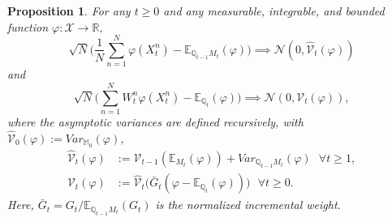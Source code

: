 \documentclass[
]{book}
\theoremstyle{break}
\newtheorem{proposition}{Proposition}
\theoremstyle{nonumberplain}
\begin{document}
\begin{proposition}
For any $t\geq0$ and any measurable, integrable, and bounded function $\varphi:\mathcal X\rightarrow\mathbb R,$
$$
\sqrt{N}\bigg( \frac{1}{N} \sum\limits_{n=1}^N \varphi(X_t^n)-\mathbb E_{\mathbb Q_{t-1}M_t}(\varphi)\bigg)\implies \mathcal N(0,\hat{\mathcal{V}}_t(\varphi))
$$
and 
$$
\sqrt{N}\bigg(\sum\limits_{n=1}^N W_t^n \varphi(X_t^n)-\mathbb E_{\mathbb Q_{t}}(\varphi)\bigg)\implies \mathcal N(0,\mathcal{V}_t(\varphi)),
$$
where the asymptotic variances are defined recursively, with $ \hat{\mathcal{V}}_0(\varphi):=Var_{\mathbb M_0}(\varphi) $,
\begin{equation*}
    \begin{split}
        \hat{\mathcal{V}}_t(\varphi)&:=\mathcal{V}_{t-1}(\mathbb E_{M_t}(\varphi))+Var_{\mathbb Q_{t-1}M_t}(\varphi) \text{ }\forall t\geq1, \\
        \mathcal{V}_t(\varphi)&:=\hat{\mathcal{V}}_{t}\big( \bar{G}_t(\varphi-\mathbb E_{\mathbb Q_t}(\varphi)) \big) \text{ }\forall t\geq0.
    \end{split}
\end{equation*}
Here, $\bar{G}_t=G_t/\mathbb E_{\mathbb Q_{t-1}M_t}(G_t)$ is the normalized incremental weight.
\end{proposition}
\end{document}
